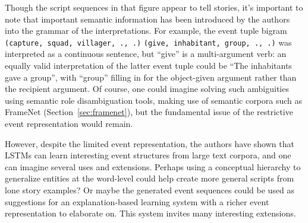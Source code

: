 Though the script sequences in that figure appear to tell stories, it's important to note that important semantic information has been introduced by the authors into the grammar of the interpretations. For example, the event tuple bigram \texttt{(capture, squad, villager, ., .)} \texttt{(give, inhabitant, group, ., .)} was interpreted as a continuous sentence, but ``give'' is a multi-argument verb: an equally valid interpretation of the latter event tuple could be ``The inhabitants gave a group'', with ``group'' filling in for the object-given argument rather than the recipient argument. Of course, one could imagine solving such ambiguities using semantic role disambiguation tools, making use of semantic corpora such as FrameNet (Section~\ref{sec:framenet}), but the fundamental issue of the restrictive event representation would remain.

However, despite the limited event representation, the authors have shown that LSTMs can learn interesting event structures from large text corpora, and one can imagine several uses and extensions. Perhaps using a conceptual hierarchy to generalize entities at the word-level could help create more general scripts from lone story examples? Or maybe the generated event sequences could be used as suggestions for an explanation-based learning system with a richer event representation to elaborate on. This system invites many interesting extensions.

